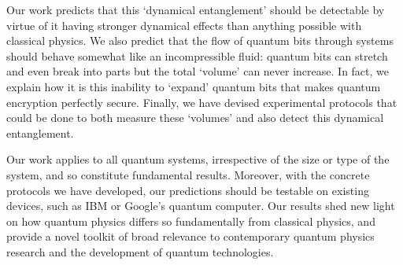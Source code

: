 \documentclass[11pt]{letter}
\begin{document}
Our work predicts that this `dynamical entanglement' should be detectable by virtue of it having stronger dynamical effects than anything possible with classical physics. We also predict that the flow of quantum bits through systems should behave somewhat like an incompressible fluid: quantum bits can stretch and even break into parts but the total `volume' can never increase. In fact, we explain how it is this inability to `expand' quantum bits that makes quantum encryption perfectly secure. Finally, we have devised experimental protocols that could be done to both measure these `volumes' and also detect this dynamical entanglement.
 
Our work applies to all quantum systems, irrespective of the size or type of the system, and so constitute fundamental results. Moreover, with the concrete protocols we have developed, our predictions should be testable on existing devices, such as IBM or Google's quantum computer. Our results shed new light on how quantum physics differs so fundamentally from classical physics, and provide a novel toolkit of broad relevance to contemporary quantum physics research and the development of quantum technologies.
 

\end{document}
